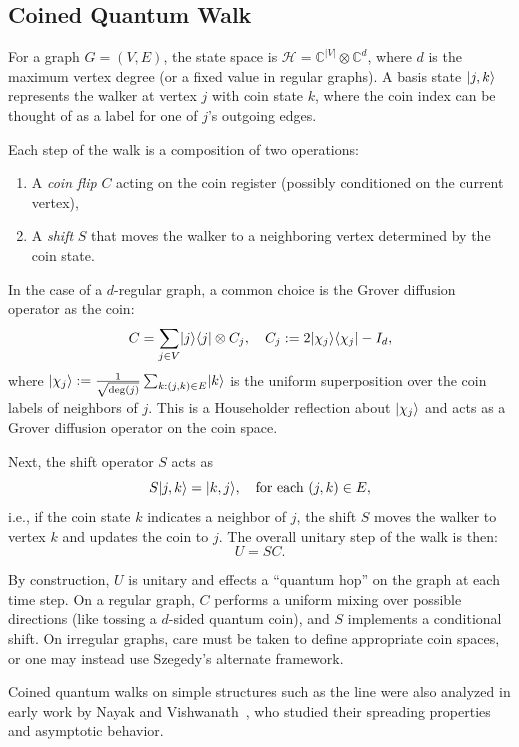 \documentclass[12pt]{report}
\begin{document}
\subsection{Coined Quantum Walk}

For a graph $G=(V,E)$, the state space is $\mathcal{H} = \mathbb{C}^{|V|} \otimes \mathbb{C}^d$, where $d$ is the maximum vertex degree (or a fixed value in regular graphs). A basis state $\lvert j,k\rangle$ represents the walker at vertex $j$ with coin state $k$, where the coin index can be thought of as a label for one of $j$'s outgoing edges.

Each step of the walk is a composition of two operations:
\begin{enumerate}
    \item A \emph{coin flip} $C$ acting on the coin register (possibly conditioned on the current vertex),
    \item A \emph{shift} $S$ that moves the walker to a neighboring vertex determined by the coin state.
\end{enumerate}

In the case of a $d$-regular graph, a common choice is the Grover diffusion operator as the coin:
\[
C = \sum_{j \in V} \lvert j\rangle\langle j\rvert \otimes C_j, \quad C_j := 2 \lvert\chi_j\rangle\langle\chi_j\rvert - I_d,
\]
where $\lvert\chi_j\rangle := \frac{1}{\sqrt{\deg(j)}} \sum_{k : (j,k) \in E} \lvert k\rangle$ is the uniform superposition over the coin labels of neighbors of $j$. This is a Householder reflection about $\lvert\chi_j\rangle$ and acts as a Grover diffusion operator on the coin space.

Next, the shift operator $S$ acts as
\[
S \lvert j,k\rangle = \lvert k,j\rangle, \quad \text{for each } (j,k) \in E,
\]
i.e., if the coin state $k$ indicates a neighbor of $j$, the shift $S$ moves the walker to vertex $k$ and updates the coin to $j$. The overall unitary step of the walk is then:
\[
U = S C.
\]

By construction, $U$ is unitary and effects a “quantum hop” on the graph at each time step. On a regular graph, $C$ performs a uniform mixing over possible directions (like tossing a $d$-sided quantum coin), and $S$ implements a conditional shift. On irregular graphs, care must be taken to define appropriate coin spaces, or one may instead use Szegedy’s alternate framework.

Coined quantum walks on simple structures such as the line were also analyzed in early work by Nayak and Vishwanath~\cite{Nayak2000}, who studied their spreading properties and asymptotic behavior.
\end{document}
